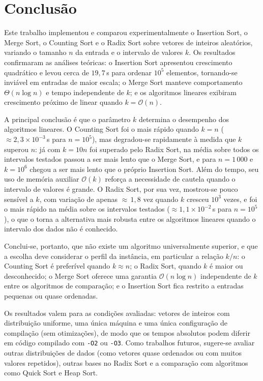 \documentclass[12pt]{article}
\begin{document}
\section{Conclusão}
\label{sec:conclusao}

Este trabalho implementou e comparou experimentalmente o Insertion Sort, o
Merge Sort, o Counting Sort e o Radix Sort sobre vetores de inteiros
aleatórios, variando o tamanho $n$ da entrada e o intervalo de valores $k$.
Os resultados confirmaram as análises teóricas: o Insertion Sort apresentou
crescimento quadrático e levou cerca de $19{,}7$\,s para ordenar
$10^{5}$ elementos, tornando-se inviável em entradas de maior escala; o
Merge Sort manteve comportamento $\Theta(n \log n)$ e tempo independente de
$k$; e os algoritmos lineares exibiram crescimento próximo de linear
quando $k = \mathcal{O}(n)$.

A principal conclusão é que o parâmetro $k$ determina o desempenho dos
algoritmos lineares. O Counting Sort foi o mais rápido quando $k = n$
($\approx 2{,}3 \times 10^{-3}$\,s para $n = 10^{5}$), mas degradou-se
rapidamente à medida que $k$ superou $n$: já com $k = 10n$ foi superado
pelo Radix Sort, na média sobre todos os intervalos testados passou a ser
mais lento que o Merge Sort, e para $n = 1\,000$ e $k = 10^{6}$ chegou a ser
mais lento que o próprio Insertion Sort. Além do tempo, seu uso de memória
auxiliar $\mathcal{O}(k)$ reforça a necessidade de cautela quando o
intervalo de valores é grande. O Radix Sort, por sua vez, mostrou-se pouco
sensível a $k$, com variação de apenas ${\approx}\,1{,}8$ vez quando $k$
cresceu $10^{3}$ vezes, e foi o mais rápido na média sobre os intervalos
testados ($\approx 1{,}1 \times 10^{-2}$\,s para $n = 10^{5}$), o que o
torna a alternativa mais robusta entre os algoritmos lineares quando o
intervalo dos dados não é conhecido.

Conclui-se, portanto, que não existe um algoritmo universalmente superior,
e que a escolha deve considerar o perfil da instância, em particular a
relação $k/n$: o Counting Sort é preferível quando $k \approx n$; o
Radix Sort, quando $k$ é maior ou desconhecido; o Merge Sort oferece uma
garantia $\mathcal{O}(n \log n)$ independente de $k$ entre os algoritmos de
comparação; e o Insertion Sort fica restrito a entradas pequenas ou quase
ordenadas.

Os resultados valem para as condições avaliadas: vetores de inteiros com
distribuição uniforme, uma única máquina e uma única configuração de
compilação (sem otimizações), de modo que os tempos absolutos podem diferir
em código compilado com \texttt{-O2} ou \texttt{-O3}. Como trabalhos futuros, sugere-se avaliar outras distribuições
de dados (como vetores quase ordenados ou com muitos valores repetidos),
outras bases no Radix Sort e a comparação com algoritmos como Quick Sort e
Heap Sort.



\end{document}
